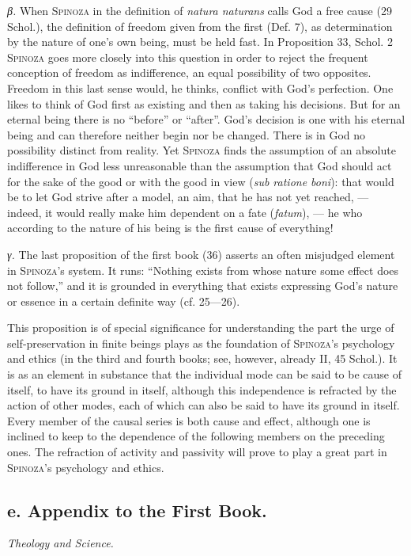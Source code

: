 \documentclass[12pt]{article}
\newcommand{\opage}[1]{\marginnote{\footnotesize\textit{[#1]}}}
\begin{document}
\textit{β.} When \textsc{Spinoza} in the definition of \textit{natura naturans} calls God
a free cause (29 Schol.), the definition of freedom given from the first (Def. 7), as
determination by the nature of one's own being, must be held fast. In Proposition 33,
Schol. 2 \textsc{Spinoza} goes more closely into this question in order to reject the
frequent conception of freedom as indifference, an equal possibility of two opposites.
Freedom in this last sense would, he thinks, conflict with God's perfection. One likes to
think of God first as existing and then as taking his decisions. But for an eternal being
there is no ``before'' or ``after''. God's decision is one with his eternal being and can
therefore neither begin nor be changed. There is in God no possibility distinct from
reality. Yet \textsc{Spinoza} finds the assumption of an absolute indifference in God less
unreasonable than the assumption that God should act for the sake of the good or with the
good in view (\textit{sub ratione boni}): that would be to let God strive after a model,
an aim, that he has not yet reached, --- indeed, it would really make him dependent on a
fate (\textit{fatum}), --- he who according to the nature of his being is the first cause
of everything!

\textit{γ.} The last proposition of the first book (36) asserts an often misjudged
element in \textsc{Spinoza}'s system. It runs: ``Nothing exists from whose nature some
effect does not follow,'' and it is grounded in everything that exists expressing God's
nature or essence in a certain definite way (cf. 25---26).

This proposition is of special significance for understanding the part the urge of
self-preservation in finite beings plays as the foundation of \textsc{Spinoza}'s
psychology and ethics (in the third and fourth books; see, however, already II, 45
Schol.). It is as an element in substance that the individual mode can be said to be cause
of itself, to have its ground in itself, although this independence is refracted by the
action of other modes, each of which can also be said to have its ground in itself. Every
member of the causal series is both cause and effect, although one is inclined to keep to
the dependence of the following members on the preceding ones. The refraction of activity
and passivity will prove to play a great part in \textsc{Spinoza}'s psychology and
ethics.

\opage{32}\subsection*{e. Appendix to the First Book.}
\begin{center}\textit{Theology and Science.}\end{center}
\end{document}
